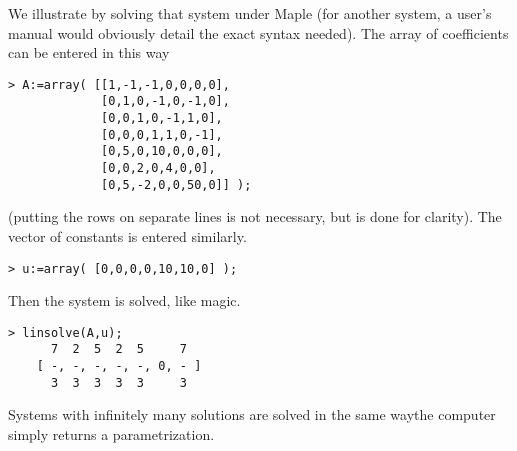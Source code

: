 We illustrate by solving that system under Maple
(for another system, a user's manual would obviously detail the exact syntax 
needed).
The array of coefficients can be entered in this way
\begin{indented}{\small
\begin{verbatim}
> A:=array( [[1,-1,-1,0,0,0,0],
             [0,1,0,-1,0,-1,0],
             [0,0,1,0,-1,1,0],
             [0,0,0,1,1,0,-1],
             [0,5,0,10,0,0,0],
             [0,0,2,0,4,0,0],
             [0,5,-2,0,0,50,0]] );
\end{verbatim}
}\end{indented}
(putting the rows on separate lines is not necessary, 
but is done for clarity).
The vector of constants is entered similarly.
\begin{indented}{\small
\begin{verbatim}
> u:=array( [0,0,0,0,10,10,0] );
\end{verbatim}
}\end{indented}
Then the system is solved, like magic.
\begin{indented}{\small
\begin{verbatim}
> linsolve(A,u);
      7  2  5  2  5     7
    [ -, -, -, -, -, 0, - ]
      3  3  3  3  3     3
\end{verbatim}
}\end{indented}
Systems with infinitely many solutions are solved in the same
way\Dash the computer simply returns a parametrization.




